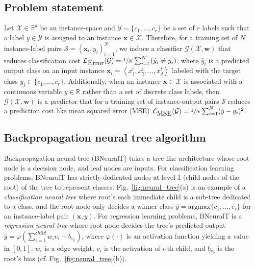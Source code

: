 \documentclass[11pt,a4paper]{article}
\begin{document}
\subsection{Problem statement} 
    \label{sec:problem_stmt}
    Let $ \mathcal{X} \in \mathbb{R}^d$ be an instance-space and $ \mathcal{Y} = \{c_1, \ldots,c_r \} $ be a set of $ r $ labels such that a label $ y \in \mathcal{Y} $ is assigned to an instance $ \textbf{x} \in \mathcal{X} $. Therefore, for a training set of $N$ instance-label pairs $ \mathcal{S} = \left(\textbf{x}_i, y_i \right)_{i=1}^{N} $, we induce a classifier $ \mathcal{G}(\mathcal{X}, \mathbf{w}) $ that reduces classification cost 
    $\mathcal{L}_{\mbox{Error}}(\mathcal{G}) =  \sfrac{1}{N}\sum_{i=1}^{N} (\hat{y}_i \ne y_i)$, 
    where $ \hat{y}_i $ is a predicted output class on an input instance $\textbf{x}_i = \left\langle x^i_1, x^i_2, \ldots, x^i_d \right\rangle$ labeled with the target class $ y_i \in \{c_1, \ldots,c_r \}$. Additionally, when an instance $ \textbf{x} \in \mathcal{X} $ is associated with a continuous variable $ y \in \mathbb{R} $ rather than  a set of  discrete class labels, then $ \mathcal{G}(\mathcal{X}, \mathbf{w}) $ is a predictor that for a training set of instance-output pairs $ \mathcal{S} $ reduces a prediction cost like mean squared error (MSE) $\mathcal{L}_{\mbox{MSE}}(\mathcal{G}) =  \sfrac{1}{N}\sum_{i=1}^{N} (\hat{y} - y_i)^2.$
    
    \subsection{Backpropagation neural tree algorithm}
    Backpropagation neural tree (BNeuralT) takes a tree-like architecture whose root node is a decision node, and leaf nodes are inputs. For classification learning problems, BNeuralT has strictly dedicated nodes at level-1 (child nodes of the root) of the tree to represent classes. Fig.~\ref{fig:neural_tree}(a) is an example of a \textit{classification neural tree} where root's each immediate child is a sub-tree dedicated to a class, and the root node only decides a winner class $ \hat{y} = \text{argmax}\{c_1, \ldots,c_r \} $ for an instance-label pair $ (\textbf{x}, y)$. For regression learning problems, BNeuralT is a \textit{regression neural tree} whose root node decides the tree's predicted output $ \hat{y} = \varphi(\sum_{i=1}^{child} w_i v_i + b_{v_0}) $, where $ \varphi(\cdot) $ is an activation function yielding a value in $[0, 1]$, $w_i$ is a edge weight, $v_i$ is the activation of $i$-th child, and $b_{v_0}$ is the root's bias (cf. Fig.~\ref{fig:neural_tree}(b)).
    
\end{document}
